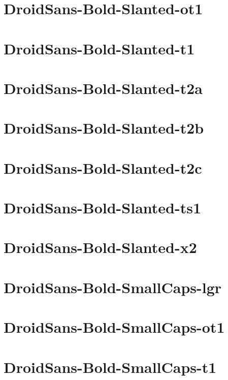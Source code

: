 \documentclass{article}
\begin{document}
\section{DroidSans-Bold-Slanted-ot1}

\section{DroidSans-Bold-Slanted-t1}

\section{DroidSans-Bold-Slanted-t2a}

\section{DroidSans-Bold-Slanted-t2b}

\section{DroidSans-Bold-Slanted-t2c}

\section{DroidSans-Bold-Slanted-ts1}

\section{DroidSans-Bold-Slanted-x2}

\section{DroidSans-Bold-SmallCaps-lgr}

\section{DroidSans-Bold-SmallCaps-ot1}

\section{DroidSans-Bold-SmallCaps-t1}
\end{document}
